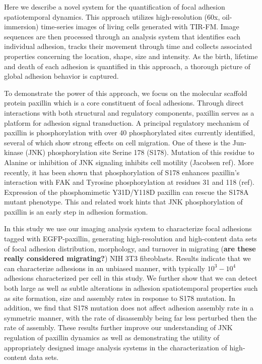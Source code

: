 \documentclass[10pt]{article}
\begin{document}
Here we describe a novel system for the quantification of focal adhesion
spatiotemporal dynamics. This approach utilizes high-resolution
(60x, oil-immersion) time-series images of living cells generated with TIR-FM. Image
sequences are then processed through an analysis system that identifies each
individual adhesion, tracks their movement through time and collects associated
properties concerning the location, shape, size and intensity. As the birth,
lifetime and death of each adhesion is quantified in this approach, a thorough
picture of global adhesion behavior is captured.

To demonstrate the power of this approach, we focus on the molecular scaffold
protein paxillin which is a core constituent of focal adhesions. Through direct
interactions with both structural and regulatory components, paxillin serves as
a platform for adhesion signal transduction. A principal regulatory mechanism of
paxillin is phosphorylation with over 40 phosphorylated sites currently
identified, several of which show strong effects on cell migration. One of these
is the Jun-kinase (JNK) phosphorylation site Serine 178 (S178). Mutation of this
residue to Alanine or inhibition of JNK signaling inhibits cell motility (Jacobsen ref).
More recently, it has been shown that phosphorylation of S178 enhances
paxillin's interaction with FAK and Tyrosine phosphorylation at residues 31 and
118 (ref). Expression of the phosphomimetic Y31D/Y118D paxillin can rescue the
S178A mutant phenotype. This and related work hints that JNK phosphorylation of
paxillin is an early step in adhesion formation. 

In this study we use our imaging analysis system to characterize focal adhesions tagged with EGFP-paxillin, generating high-resolution and high-content data sets of focal adhesion distribution, morphology, and turnover in migrating (\textbf{are these really considered migrating?}) NIH 3T3 fibroblasts. Results indicate that we can characterize adhesions in an unbiased manner, with typically $10^3-10^4$ adhesions characterized per cell in this study. We further show that we can detect both large as well as subtle alterations in adhesion spatiotemporal properties such as site formation, size and assembly rates in response to S178 mutation. In addition, we find that S178 mutation does not affect adhesion assembly rate in a symmetric manner, with the rate of disassembly being far less perturbed then the rate of assembly. These results further improve our understanding of JNK regulation of paxillin dynamics as well as demonstrating the utility of appropriately designed image analysis systems in the characterization of high-content data sets. 
\end{document}
